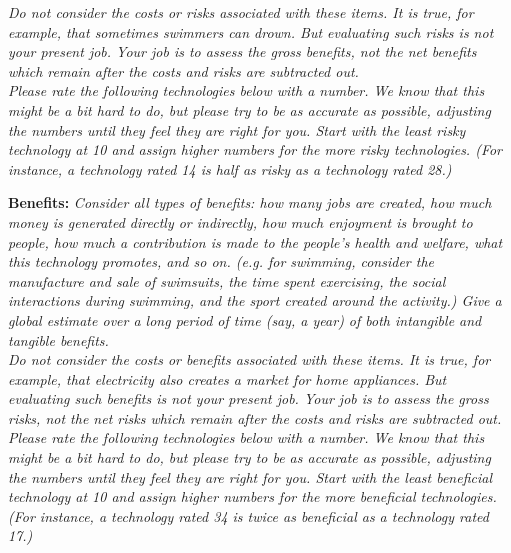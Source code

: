 \documentclass{acm_proc_article-sp}
\begin{document}
\textit{Do not consider the costs or risks associated with these items. It is true, for example, that sometimes swimmers can drown. But evaluating such risks is not your present job. Your job is to assess the gross benefits, not the net benefits which remain after the costs and risks are subtracted out.} \\[-.6cm]

\textit{Please rate the following technologies below with a number. We know that this might be a bit hard to do, but please try to be as accurate as possible, adjusting the numbers until they feel they are right for you. Start with the least risky technology at 10 and assign higher numbers for the more risky technologies. (For instance, a technology rated 14 is half as risky as a technology rated 28.)}

{\bf Benefits:} \textit{Consider all types of benefits: how many jobs are created, how much money is generated directly or indirectly, how much enjoyment is brought to people, how much a contribution is made to the people's health and welfare, what this technology promotes, and so on. (e.g. for swimming, consider the manufacture and sale of swimsuits, the time spent exercising, the social interactions during swimming, and the sport created around the activity.) Give a global estimate over a long period of time (say, a year) of both intangible and tangible benefits.} \\[-.6cm]

\textit{Do not consider the costs or benefits associated with these items. It is true, for example, that electricity also creates a market for home appliances. But evaluating such benefits is not your present job. Your job is to assess the gross risks, not the net risks which remain after the costs and risks are subtracted out.} \\[-.6cm]

\textit{Please rate the following technologies below with a number. We know that this might be a bit hard to do, but please try to be as accurate as possible, adjusting the numbers until they feel they are right for you. Start with the least beneficial technology at 10 and assign higher numbers for the more beneficial technologies. (For instance, a technology rated 34 is twice as beneficial as a technology rated 17.)}
\end{document}

